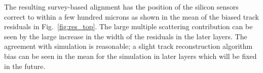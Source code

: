 The resulting survey-based alignment has the position of the silicon sensors correct to within a few hundred 
microns as shown in the mean of the biased track residuals in Fig.~\ref{fig:res_top}.  The large multiple scattering contribution can be seen by the large increase in the width of the residuals in the later layers. The agreement with simulation is reasonable; a slight track reconstruction algorithm bias can be seen in the mean for the simulation in later layers which will be fixed in the future. 
